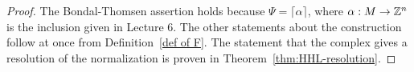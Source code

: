 \documentclass{amsart}
\begin{document}
 \begin{proof} 
 The Bondal-Thomsen assertion holds because $\Psi = \lceil \alpha \rceil$, where $\alpha:M\rightarrow \mathbb Z^n$ is the
 inclusion given in Lecture 6. 
 The other statements about the construction follow at once from Definition~\ref{def of F}. The statement that the complex gives a resolution of the normalization is proven in Theorem~\ref{thm:HHL-resolution}. 
  \end{proof}
%
%
\end{document}
